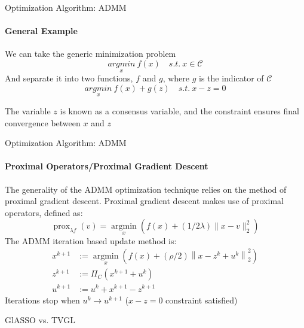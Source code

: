 \documentclass{beamer}
\begin{document}
\begin{frame}{Optimization Algorithm: ADMM}
\framesubtitle{General Example}
We can take the generic minimization problem
\[\underset{x}{argmin} \ f(x) \quad s.t. \ x \in \mathcal{C}\]
And separate it into two functions, $f$ and $g$, where $g$ is the indicator of $\mathcal{C}$
\[\underset{x}{argmin} \ f(x) + g(z) \quad s.t. \ x - z = 0\]
\begin{center} The variable $z$ is known as a consensus variable, and the constraint ensures final convergence between $x$ and $z$ \end{center}

\end{frame}

\begin{frame}{Optimization Algorithm: ADMM}
\framesubtitle{Proximal Operators/Proximal Gradient Descent}
The generality of the ADMM optimization technique relies on the method of proximal gradient descent. Proximal gradient descent makes use of proximal operators, defined as:
\[\operatorname{prox}_{\lambda f}(v)=\underset{x}{\operatorname{argmin}}\left(f(x)+(1 / 2 \lambda)\|x-v\|_{2}^{2}\right)\]
The ADMM iteration based update method is:
\begin{align} 
\nonumber x^{k+1} &:=\underset{x}{\operatorname{argmin}}\left(f(x)+(\rho / 2)\left\|x-z^{k}+u^{k}\right\|_{2}^{2}\right) 
\\ \nonumber z^{k+1} &:=\Pi_{C}\left(x^{k+1}+u^{k}\right) 
\\ \nonumber u^{k+1} &:=u^{k}+x^{k+1}-z^{k+1} 
\end{align}
Iterations stop when $u^{k} \xrightarrow{} u^{k+1}$ ($x-z = 0$ constraint satisfied)
\end{frame}


\begin{frame}{GlASSO vs. TVGL}


\end{frame}
\end{document}

